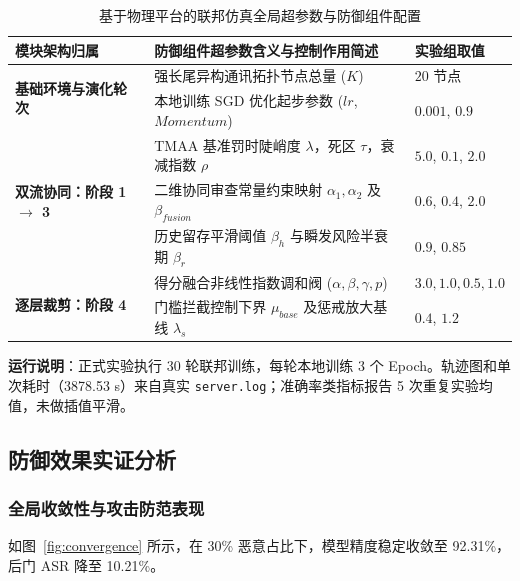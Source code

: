 \documentclass[11pt, a4paper, UTF8, fontset=fandol]{ctexart}
\begin{document}
\begin{table}[htbp]
    \centering
    \caption{基于物理平台的联邦仿真全局超参数与防御组件配置}
    \label{tab:hyperparams}
    \begin{tabular}{p{4cm} p{8.5cm} p{2cm}}
        \toprule
        \textbf{模块架构归属}                              & \textbf{防御组件超参数含义与控制作用简述}                         & \textbf{实验组取值}  \\
        \midrule
        \multirow{2}{*}{\textbf{基础环境与演化轮次}}       & 强长尾异构通讯拓扑节点总量 ($K$)                                  & $20$ 节点            \\
                                                           & 本地训练 SGD 优化起步参数 ($lr$, $Momentum$)                      & $0.001$, $0.9$       \\
        \midrule
        \multirow{3}{*}{\textbf{双流协同：阶段 1 $\to$ 3}} & TMAA 基准罚时陡峭度 $\lambda$，死区 $\tau$，衰减指数 $\rho$       & $5.0$, $0.1$, $2.0$  \\
                                                           & 二维协同审查常量约束映射 $\alpha_1, \alpha_2$ 及 $\beta_{fusion}$ & $0.6$, $0.4$, $2.0$  \\
                                                           & 历史留存平滑阈值 $\beta_h$ 与瞬发风险半衰期 $\beta_r$             & $0.9$, $0.85$        \\
        \midrule
        \multirow{2}{*}{\textbf{逐层裁剪：阶段 4}}         & 得分融合非线性指数调和阀 ($\alpha, \beta, \gamma, p$)             & $3.0, 1.0, 0.5, 1.0$ \\
                                                           & 门槛拦截控制下界 $\mu_{base}$ 及惩戒放大基线 $\lambda_s$          & $0.4$, $1.2$         \\
        \bottomrule
    \end{tabular}
\end{table}

\textbf{运行说明}：正式实验执行 30 轮联邦训练，每轮本地训练 3 个 Epoch。轨迹图和单次耗时（3878.53 s）来自真实 \texttt{server.log}；准确率类指标报告 5 次重复实验均值，未做插值平滑。

\subsection{防御效果实证分析}

\subsubsection{全局收敛性与攻击防范表现}
如图~\ref{fig:convergence} 所示，在 30\% 恶意占比下，模型精度稳定收敛至 92.31\%，后门 ASR 降至 10.21\%。
\end{document}
